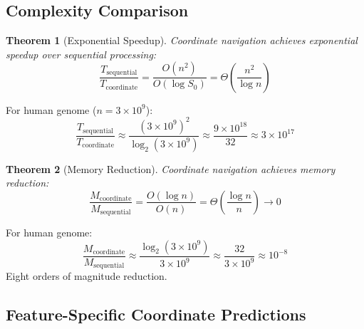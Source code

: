 \documentclass[11pt,a4paper]{article}
\newtheorem{theorem}{Theorem}[section]
\theoremstyle{remark}
\begin{document}
\subsection{Complexity Comparison}

\begin{theorem}[Exponential Speedup]
\label{thm:exponential_speedup}
Coordinate navigation achieves exponential speedup over sequential processing:
\begin{equation}
\frac{T_{\text{sequential}}}{T_{\text{coordinate}}} = \frac{O(n^2)}{O(\log S_0)} = \Theta\left(\frac{n^2}{\log n}\right)
\end{equation}
\end{theorem}

For human genome ($n = 3 \times 10^9$):
\begin{equation}
\frac{T_{\text{sequential}}}{T_{\text{coordinate}}} \approx \frac{(3 \times 10^9)^2}{\log_2(3 \times 10^9)} \approx \frac{9 \times 10^{18}}{32} \approx 3 \times 10^{17}
\end{equation}

\begin{theorem}[Memory Reduction]
\label{thm:memory_reduction}
Coordinate navigation achieves memory reduction:
\begin{equation}
\frac{M_{\text{coordinate}}}{M_{\text{sequential}}} = \frac{O(\log n)}{O(n)} = \Theta\left(\frac{\log n}{n}\right) \to 0
\end{equation}
\end{theorem}

For human genome:
\begin{equation}
\frac{M_{\text{coordinate}}}{M_{\text{sequential}}} \approx \frac{\log_2(3 \times 10^9)}{3 \times 10^9} \approx \frac{32}{3 \times 10^9} \approx 10^{-8}
\end{equation}
Eight orders of magnitude reduction.

\subsection{Feature-Specific Coordinate Predictions}
\end{document}
